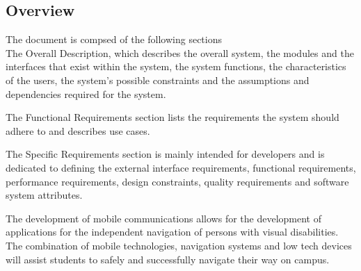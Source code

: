 	\subsection{Overview}
		The document is compsed of the following sections \\
		The Overall Description, which describes the overall system, the modules and the interfaces that exist within the system, the system functions, the characteristics of the users, the system's possible constraints and the assumptions and dependencies required for the system.\\ \par\noindent
		The Functional Requirements section lists the requirements the system should adhere to and describes use cases.\\ \par\noindent
		The Specific Requirements section is mainly intended for developers and is dedicated to defining the external interface requirements, functional requirements, performance requirements, design constraints, quality requirements and software system attributes.\\ \par\noindent
		The development of mobile communications allows for the development of applications for the independent navigation of persons with visual disabilities. The combination of mobile technologies, navigation systems and low tech devices will assist students to safely and successfully navigate their way on campus.
